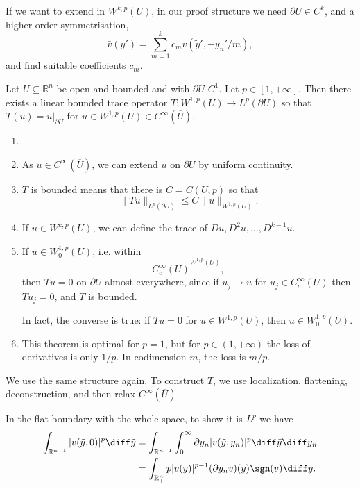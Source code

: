 \documentclass[12pt]{article}
\begin{document}
\begin{remark}
	If we want to extend in $W^{k, p}(U)$, in our proof structure we need $\partial U \in C^k$, and a higher order symmetrisation,
	\[
	\bar v(y') = \sum_{m = 1}^k c_m v(\tilde y', - y_n'/m),
	\]
	and find suitable coefficients $c_m$.
\end{remark}

\begin{theorem}
	Let $U \subseteq \mathbb{R}^n$ be open and bounded and with $\partial U$ $C^1$. Let $p \in [1, +\infty]$. Then there exists a linear bounded trace operator $T : W^{1, p}(U) \to L^{p}(\partial U)$ so that $T(u) = u|_{\partial U}$ for $u \in W^{1, p}(U) \in C^{\infty}(\overline{U})$.
\end{theorem}

\begin{remark}
	\begin{enumerate}
		\item[]
		\item As $u \in C^{\infty}(\overline{U})$, we can extend $u$ on $\partial U$ by uniform continuity.
		\item $T$ is bounded means that there is $C = C(U, p)$ so that
			\[
			\|Tu\|_{L^p(\partial U)} \leq C \|u\|_{W^{1,p}(U)}.
			\]
		\item If $u \in W^{k, p}(U)$, we can define the trace of $Du, D^2u, \ldots, D^{k-1}u$.
		\item If $u \in W^{1,p}_{0}(U)$, i.e. within
			\[
			\overline{C_c^\infty(U)}^{W^{1, p}(U)},
			\]
			then $Tu = 0$ on $\partial U$ almost everywhere, since if $u_j \to u$ for $u_j \in C_c^{\infty}(U)$ then $Tu_j = 0$, and $T$ is bounded.

			In fact, the converse is true: if $Tu = 0$ for $u \in W^{1, p}(U)$, then $u \in W^{1,p}_0(U)$.
		\item This theorem is optimal for $p = 1$, but for $p \in (1, +\infty)$ the loss of derivatives is only $1/p$. In codimension $m$, the loss is $m/p$.
	\end{enumerate}
	
\end{remark}

\begin{proofbox}
	We use the same structure again. To construct $T$, we use localization, flattening, deconstruction, and then relax $C^{\infty}(\overline{U})$.

	In the flat boundary with the whole space, to show it is $L^p$ we have
	\begin{align*}
		\int_{\mathbb{R}^{n-1}} |v(\tilde y, 0)|^p \diff \tilde y &= \int_{\mathbb{R}^{n-1}} \int_0^{\infty} \partial y_n |v(\tilde y, y_n)|^p \diff \tilde y \diff y_n \\
									  &= \int_{\mathbb{R}_+^n} p|v(y)|^{p-1} (\partial y_n v)(y) \sgn(v) \diff y.
	\end{align*}
\end{proofbox}
\end{document}
